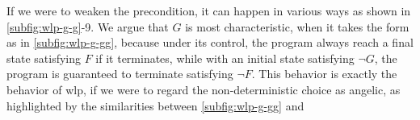 If we were to weaken the precondition, it can happen in various ways as shown in \autoref{subfig:wlp-g-g}{\color{RoyalBlue}-9}. 
We argue that $G$ is most characteristic, when it takes the form as in \autoref{subfig:wlp-g-gg}, because under its control, the program always  reach a final state satisfying $F$ if it terminates, while with an initial state satisfying $\neg G$, the program is guaranteed to terminate satisfying $\neg F$. 
This behavior is exactly the behavior of wlp, if we were to regard the non-deterministic choice as angelic, as highlighted by the similarities between \autoref{subfig:wlp-g-gg} and 

\begin{figure}[ht!]\centering
	\hfill

	\hfill


\end{figure}
